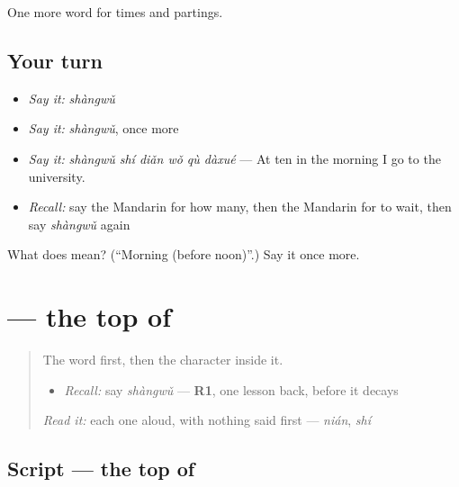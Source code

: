 \begin{grammarlens}[title={What you've built}]
One more word for times and partings.
\end{grammarlens}

\subsection*{Your turn}
\begin{itemize}
\raggedright
  \item \emph{Say it:} \emph{shàngwǔ}
  \item \emph{Say it:} \emph{shàngwǔ}, once more
  \item \emph{Say it:} \emph{shàngwǔ shí diǎn wǒ qù dàxué} — At ten in the morning I go to the university.
  \item \emph{Recall:} say the Mandarin for how many, then the Mandarin for to wait, then say \emph{shàngwǔ} again
\end{itemize}

\begin{tcolorbox}[breakable,colback=teal!4,colframe=teal!35!black,title={Before you move on}]
What does  mean? (\textquotedblleft{}Morning (before noon)\textquotedblright{}.) Say it once more.
\end{tcolorbox}
\section[\texorpdfstring{\zh{午} (wǔ)}{午 (wǔ)}]{ — the top of }

\label{lesson:ZH-W49-wu-noon}



\begin{quote}
The word first, then the character inside it.

\begin{itemize}
\raggedright
  \item \emph{Recall:} say \emph{shàngwǔ} — \textbf{R1}, one lesson back, before it decays
\end{itemize}

\begin{quote}
 
\end{quote}

\emph{Read it:} each one aloud, with nothing said first — \emph{nián}, \emph{shí}
\end{quote}

\subsection*{Script — the top of }

